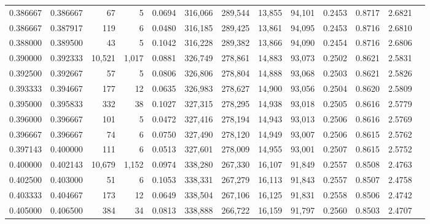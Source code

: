 \begin{tabular}{rrrrrrrrrrrrr}
0.386667 & 0.386667 &     67 &     5 &                                     0.0694 & 316,066 & 289,544 &  13,855 &  94,101 & 0.2453 & 0.8717 & 2.6821 \\
0.386667 & 0.387917 &    119 &     6 &                                     0.0480 & 316,185 & 289,425 &  13,861 &  94,095 & 0.2453 & 0.8716 & 2.6810 \\
0.388000 & 0.389500 &     43 &     5 &                                     0.1042 & 316,228 & 289,382 &  13,866 &  94,090 & 0.2454 & 0.8716 & 2.6806 \\
0.390000 & 0.392333 & 10,521 & 1,017 &                                     0.0881 & 326,749 & 278,861 &  14,883 &  93,073 & 0.2502 & 0.8621 & 2.5831 \\
0.392500 & 0.392667 &     57 &     5 &                                     0.0806 & 326,806 & 278,804 &  14,888 &  93,068 & 0.2503 & 0.8621 & 2.5826 \\
0.393333 & 0.394667 &    177 &    12 &                                     0.0635 & 326,983 & 278,627 &  14,900 &  93,056 & 0.2504 & 0.8620 & 2.5809 \\
0.395000 & 0.395833 &    332 &    38 &                                     0.1027 & 327,315 & 278,295 &  14,938 &  93,018 & 0.2505 & 0.8616 & 2.5779 \\
0.396000 & 0.396667 &    101 &     5 &                                     0.0472 & 327,416 & 278,194 &  14,943 &  93,013 & 0.2506 & 0.8616 & 2.5769 \\
0.396667 & 0.396667 &     74 &     6 &                                     0.0750 & 327,490 & 278,120 &  14,949 &  93,007 & 0.2506 & 0.8615 & 2.5762 \\
0.397143 & 0.400000 &    111 &     6 &                                     0.0513 & 327,601 & 278,009 &  14,955 &  93,001 & 0.2507 & 0.8615 & 2.5752 \\
0.400000 & 0.402143 & 10,679 & 1,152 &                                     0.0974 & 338,280 & 267,330 &  16,107 &  91,849 & 0.2557 & 0.8508 & 2.4763 \\
0.402500 & 0.403000 &     51 &     6 &                                     0.1053 & 338,331 & 267,279 &  16,113 &  91,843 & 0.2557 & 0.8507 & 2.4758 \\
0.403333 & 0.404667 &    173 &    12 &                                     0.0649 & 338,504 & 267,106 &  16,125 &  91,831 & 0.2558 & 0.8506 & 2.4742 \\
0.405000 & 0.406500 &    384 &    34 &                                     0.0813 & 338,888 & 266,722 &  16,159 &  91,797 & 0.2560 & 0.8503 & 2.4707 \\

\end{tabular}
